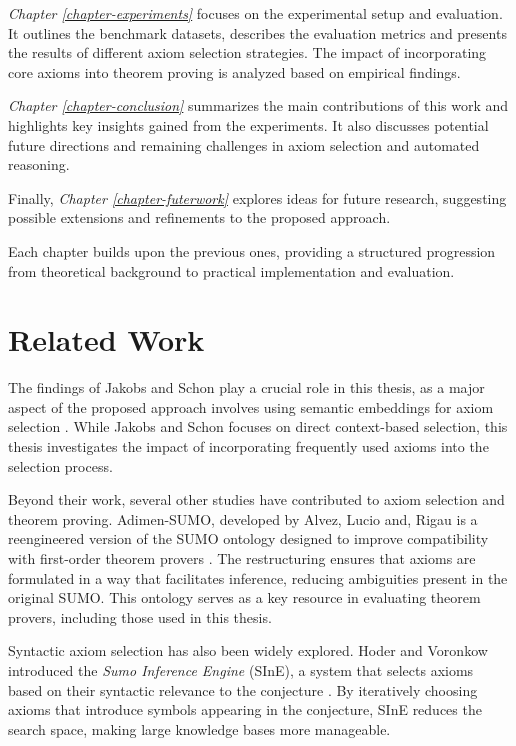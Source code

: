 \documentclass[english,version-2020-11]{uzl-thesis}
\begin{document}
\textit{Chapter \ref{chapter-experiments}} focuses on the experimental setup and evaluation. It outlines the benchmark datasets, describes the evaluation metrics and presents the results of different axiom selection strategies. The impact of incorporating core axioms into theorem proving is analyzed based on empirical findings.

\textit{Chapter \ref{chapter-conclusion}} summarizes the main contributions of this work and highlights key insights gained from the experiments. It also discusses potential future directions and remaining challenges in axiom selection and automated reasoning.

Finally, \textit{Chapter \ref{chapter-futerwork}} explores ideas for future research, suggesting possible extensions and refinements to the proposed approach.

Each chapter builds upon the previous ones, providing a structured progression from theoretical background to practical implementation and evaluation.


\chapter{Related Work}
\label{chapter-relatedwork}
The findings of Jakobs and Schon play a crucial role in this thesis, as a major aspect of the proposed approach involves using semantic embeddings for axiom selection \cite{Schon2024}.
While Jakobs and Schon focuses on direct context-based selection, this thesis investigates the impact of incorporating frequently used axioms into the selection process.

Beyond their work, several other studies have contributed to axiom selection and theorem proving. Adimen-SUMO, developed by Alvez, Lucio and, Rigau is a reengineered version of the SUMO ontology designed to improve compatibility with first-order theorem provers \cite{Alvez2014}. The restructuring ensures that axioms are formulated in a way that facilitates inference, reducing ambiguities present in the original SUMO. This ontology serves as a key resource in evaluating theorem provers, including those used in this thesis.

Syntactic axiom selection has also been widely explored. Hoder and Voronkow introduced the \textit{Sumo Inference Engine} (SInE), a system that selects axioms based on their syntactic relevance to the conjecture \cite{Hoder2011}. By iteratively choosing axioms that introduce symbols appearing in the conjecture, SInE reduces the search space, making large knowledge bases more manageable.
\end{document}
